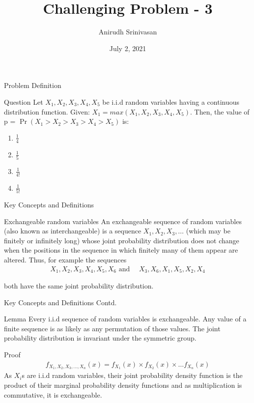 \documentclass{beamer}
\title{Challenging Problem - 3}
\author{Anirudh Srinivasan}
\institute{IIT Hyderabad}
\date{July 2, 2021}
\providecommand{\pr}[1]{\ensuremath{\Pr\left(#1\right)}}
\begin{document}
\begin{frame}
\titlepage
\end{frame}
\begin{frame}{Problem Definition}
\begin{block}{Question}
Let $X_1, X_2, X_3, X_4, X_5$ be i.i.d random variables having a continuous distribution function. Given: $X_1 = max(X_1,X_2,X_3,X_4,X_5)$. Then, the value of p = $\pr{X_1 > X_2 > X_3 > X_4 > X_5}$ is:

\begin{enumerate}
     \item $\frac{1}{4}$
     \item $\frac{1}{5}$
     \item $\frac{1}{4!}$
     \item $\frac{1}{5!}$
\end{enumerate}
\end{block}
\end{frame}

\begin{frame}{Key Concepts and Definitions}
\begin{block}{Exchangeable random variables}
An exchangeable sequence of random variables (also known as interchangeable) is a sequence $X_1, X_2, X_3, \dots $ (which may be finitely or infinitely long) whose joint probability distribution does not change when the positions in the sequence in which finitely many of them appear are altered. Thus, for example the sequences
\begin{align}
    X_{1},X_{2},X_{3},X_{4},X_{5},X_{6}{\text{ and }}\quad X_{3},X_{6},X_{1},X_{5},X_{2},X_{4}
\end{align}

both have the same joint probability distribution.
\end{block}    


\end{frame}

\begin{frame}{Key Concepts and Definitions Contd.}
\begin{block}{Lemma}
Every i.i.d sequence of random variables is exchangeable. 
Any value of a finite sequence is as likely as any permutation of those values. The joint probability distribution is invariant under the symmetric group.
\end{block}    
\begin{block}{Proof}
\begin{align}
    f_{X_1,X_2,X_3,\dots,X_n}(x) = f_{X_1}(x) \times f_{X_2}(x) \times \dots f_{X_n}(x) 
\end{align}
As $X_i$s are i.i.d random variables, their joint probability density function is the product of their marginal probability density functions and as multiplication is commutative, it is exchangeable.
\end{block}

\end{frame}
\end{document}
